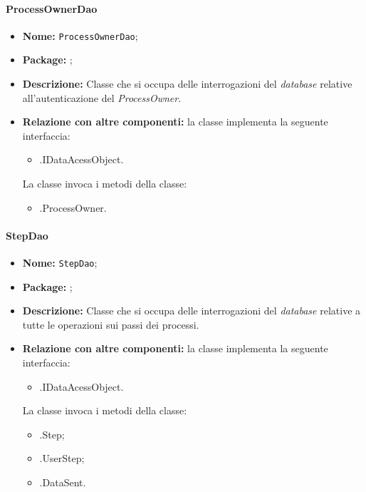 \paragraph{ProcessOwnerDao}
\begin{itemize}
\item \textbf{Nome:} \texttt{ProcessOwnerDao};
\item \textbf{Package:} \texttt{\smodel{}};
\item \textbf{Descrizione:} Classe che si occupa delle interrogazioni del \textit{database} relative all'autenticazione del \textit{ProcessOwner}.
\item \textbf{Relazione con altre componenti:} la classe implementa la seguente interfaccia:
		\begin{itemize}
			\item \smodel{}.IDataAcessObject.
		\end{itemize}
		La classe invoca i metodi della classe:
		\begin{itemize}
			\item \smodel{}.ProcessOwner.
		\end{itemize}
\end{itemize}

\paragraph{StepDao}
\begin{itemize}
\item \textbf{Nome:} \texttt{StepDao};
\item \textbf{Package:} \texttt{\smodel{}};
\item \textbf{Descrizione:} Classe che si occupa delle interrogazioni del \textit{database} relative a tutte le operazioni sui passi dei processi.
\item \textbf{Relazione con altre componenti:} la classe implementa la seguente interfaccia:
		\begin{itemize}
			\item \smodel{}.IDataAcessObject.
		\end{itemize}
		La classe invoca i metodi della classe:
		\begin{itemize}
			\item \smodel{}.Step;
			\item \smodel{}.UserStep;
			\item \smodel{}.DataSent.
		\end{itemize}
\end{itemize}


